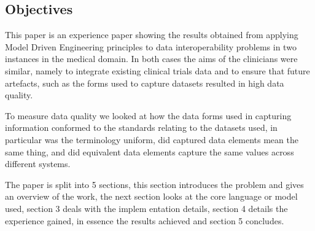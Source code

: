 \subsection{Objectives}
This paper is an experience paper showing the results obtained from applying Model Driven Engineering principles to data interoperability problems in two instances in the medical domain. In both cases the aims of the clinicians were similar, namely to integrate existing clinical trials data and to ensure that future artefacts, such as the forms used to capture datasets resulted in high data quality. 

To measure data quality we looked at how the data forms used in capturing information conformed to the standards relating to the datasets used, in particular was the terminology uniform, did captured data elements mean the same thing, and did equivalent data elements capture the same values across different systems.


The paper is split into 5 sections, this section introduces the problem and gives an overview of the work, the next section looks at the core language or model used, section 3 deals with the implem   entation details, section 4 details the experience gained, in essence the results achieved and section 5 concludes.
